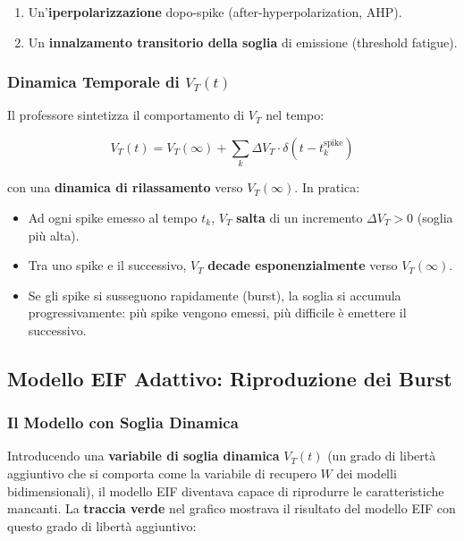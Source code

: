 \begin{enumerate}
    \item Un'\textbf{iperpolarizzazione} dopo-spike (after-hyperpolarization, AHP).
    \item Un \textbf{innalzamento transitorio della soglia} di emissione (threshold fatigue).
\end{enumerate}

\subsubsection{Dinamica Temporale di $V_T(t)$}

Il professore sintetizza il comportamento di $V_T$ nel tempo:

\begin{equation}
V_T(t) = V_T(\infty) + \sum_k \Delta V_T \cdot \delta(t - t_k^{\text{spike}})
\end{equation}

con una \textbf{dinamica di rilassamento} verso $V_T(\infty)$. In pratica:

\begin{itemize}
    \item Ad ogni spike emesso al tempo $t_k$, $V_T$ \textbf{salta} di un incremento $\Delta V_T > 0$ (soglia più alta).
    \item Tra uno spike e il successivo, $V_T$ \textbf{decade esponenzialmente} verso $V_T(\infty)$.
    \item Se gli spike si susseguono rapidamente (burst), la soglia si accumula progressivamente: più spike vengono emessi, più difficile è emettere il successivo.
\end{itemize}

\subsection{Modello EIF Adattivo: Riproduzione dei Burst}

\subsubsection{Il Modello con Soglia Dinamica}

Introducendo una \textbf{variabile di soglia dinamica} $V_T(t)$ (un grado di libertà aggiuntivo che si comporta come la variabile di recupero $W$ dei modelli bidimensionali), il modello EIF diventava capace di riprodurre le caratteristiche mancanti. La \textbf{traccia verde} nel grafico mostrava il risultato del modello EIF con questo grado di libertà aggiuntivo:

